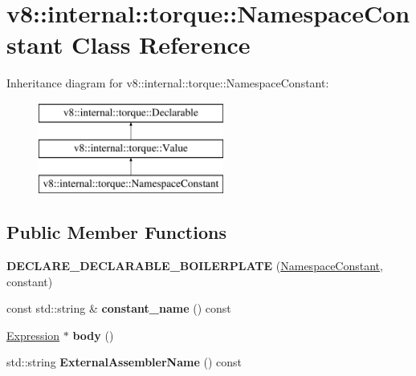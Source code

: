 \hypertarget{classv8_1_1internal_1_1torque_1_1NamespaceConstant}{}\section{v8\+:\+:internal\+:\+:torque\+:\+:Namespace\+Constant Class Reference}
\label{classv8_1_1internal_1_1torque_1_1NamespaceConstant}
Inheritance diagram for v8\+:\+:internal\+:\+:torque\+:\+:Namespace\+Constant\+:\begin{figure}[H]
\begin{center}
\leavevmode
\includegraphics[height=3.000000cm]{classv8_1_1internal_1_1torque_1_1NamespaceConstant}
\end{center}
\end{figure}
\subsection*{Public Member Functions}
\begin{DoxyCompactItemize}
\item 
\mbox{\label{classv8_1_1internal_1_1torque_1_1NamespaceConstant_acc654ea19a9a8a199adf964c482b28ad}} 
{\bfseries D\+E\+C\+L\+A\+R\+E\+\_\+\+D\+E\+C\+L\+A\+R\+A\+B\+L\+E\+\_\+\+B\+O\+I\+L\+E\+R\+P\+L\+A\+TE} (\mbox{\hyperlink{classv8_1_1internal_1_1torque_1_1NamespaceConstant}{Namespace\+Constant}}, constant)
\item 
\mbox{\label{classv8_1_1internal_1_1torque_1_1NamespaceConstant_a48b2583eec29c7ab0774b762a13b5515}} 
const std\+::string \& {\bfseries constant\+\_\+name} () const
\item 
\mbox{\label{classv8_1_1internal_1_1torque_1_1NamespaceConstant_ae9a2d16e2a4e2d0361f2c6152a8e4aea}} 
\mbox{\hyperlink{structv8_1_1internal_1_1torque_1_1Expression}{Expression}} $\ast$ {\bfseries body} ()
\item 
\mbox{\label{classv8_1_1internal_1_1torque_1_1NamespaceConstant_a853480858546f8ee5ab8e96480aa832f}} 
std\+::string {\bfseries External\+Assembler\+Name} () const
\end{DoxyCompactItemize}
